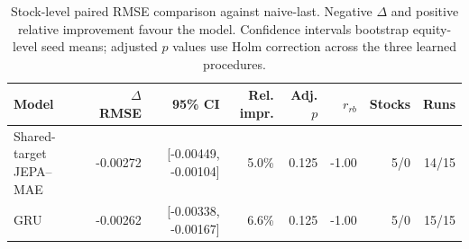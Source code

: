 \begin{table}[t]
\centering
\small
\caption{Stock-level paired RMSE comparison against naive-last. Negative $\Delta$ and positive relative improvement favour the model. Confidence intervals bootstrap equity-level seed means; adjusted $p$ values use Holm correction across the three learned procedures.}
\label{tab:paired_rmse_naive}
\begin{tabular}{lrrrrrrr}
\toprule
Model & $\Delta$RMSE & 95\% CI & Rel. impr. & Adj. $p$ & $r_{rb}$ & Stocks & Runs \\
\midrule
Shared-target JEPA--MAE & -0.00272 & [-0.00449, -0.00104] & 5.0\% & 0.125 & -1.00 & 5/0 & 14/15 \\
GRU & -0.00262 & [-0.00338, -0.00167] & 6.6\% & 0.125 & -1.00 & 5/0 & 15/15 \\
\bottomrule
\end{tabular}
\end{table}
